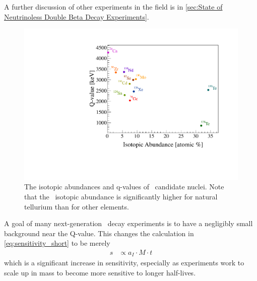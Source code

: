 A further discussion of other experiments in the field is in \autoref{sec:State of Neutrinoless Double Beta Decay Experiments}.
\begin{figure}[htbp]
    \centering
    \includegraphics[width=0.7\linewidth]{Figures/q_vs_ia-color.pdf}
    \caption[The isotopic abundances and q-values of \zeronubb~candidate nuclei]
    {The isotopic abundances and q-values of \zeronubb~candidate nuclei.
    Note that the \teonethirty~isotopic abundance is significantly higher for natural tellurium than for other elements.}
    \label{fig:q_vs_ia-color}
\end{figure}
A goal of many next-generation \zeronubb~decay experiments is to have a negligibly small background near the Q-value.
This changes the calculation in \autoref{eq:sensitivity_short} to be merely
\begin{align}
    s &\propto a_I \cdot M \cdot t
\end{align}
which is a significant increase in sensitivity, especially as experiments work to scale up in mass to become more sensitive to longer half-lives.
